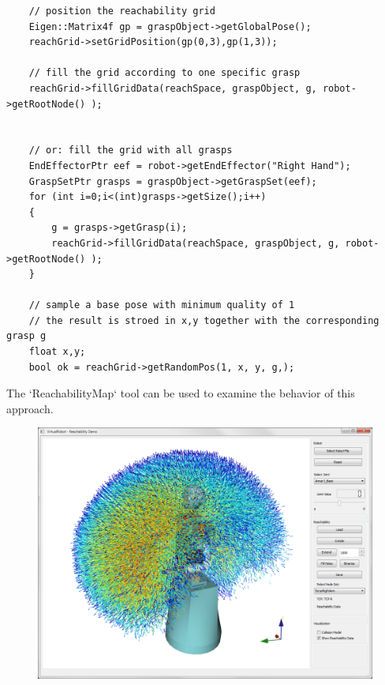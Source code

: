 \begin{itemize}
\begin{lstlisting}
    // position the reachability grid
    Eigen::Matrix4f gp = graspObject->getGlobalPose();
    reachGrid->setGridPosition(gp(0,3),gp(1,3));

    // fill the grid according to one specific grasp
    reachGrid->fillGridData(reachSpace, graspObject, g, robot->getRootNode() );


    // or: fill the grid with all grasps
    EndEffectorPtr eef = robot->getEndEffector("Right Hand");
    GraspSetPtr grasps = graspObject->getGraspSet(eef);
    for (int i=0;i<(int)grasps->getSize();i++)
    {
        g = grasps->getGrasp(i);
        reachGrid->fillGridData(reachSpace, graspObject, g, robot->getRootNode() );
    }

    // sample a base pose with minimum quality of 1
    // the result is stroed in x,y together with the corresponding grasp g
    float x,y;
    bool ok = reachGrid->getRandomPos(1, x, y, g,);
\end{lstlisting}
The `ReachabilityMap` tool can be used to examine the behavior of this approach.\par
\begin{figure}[H]
	\centering
	\begin{minipage} {.45\linewidth}
	  \includegraphics[width=\linewidth]{Reachability_HipRightArm_ArmarIII}
	\end{minipage}
	\begin{minipage} {.45\linewidth}

\end{minipage}
\end{figure}
\end{itemize}
